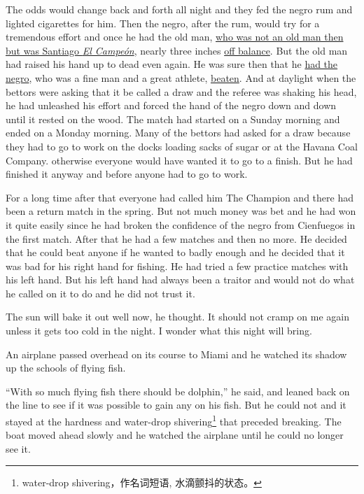 The \gls{odds} would change back and \gls{forth} all night and they fed the
negro \gls{rum} and lighted cigarettes for him. Then the negro, after the
rum, would try for a \gls{tremendous} effort and once he had the old man,
\uline{who was not an old man then but was Santiago \emph{El Campeón}},
nearly three inches \uline{off balance}. But the old man had raised his hand
up to dead even again. He was sure then that he \uline{had the negro}, who
was a fine man and a great \gls{athlete}, \uline{beaten}. And at daylight
when the bettors were asking that it be called a draw and the referee was
shaking his head, he had unleashed his effort and forced the hand of the
negro down and down until it rested on the wood. The match had started on a
Sunday morning and ended on a Monday morning. Many of the bettors had asked
for a draw because they had to go to work on the docks \gls{loading} sacks
of sugar or at the Havana Coal Company. \Gls{otherwise} everyone would have
wanted it to go to a finish. But he had finished it anyway and before anyone
had to go to work.

For a long time after that everyone had called him The Champion and there
had been a return match in the spring. But not much money was bet and he had
won it quite easily since he had broken the confidence of the negro from
Cienfuegos in the first match. After that he had a few matches and then no
more. He decided that he could beat anyone if he wanted to \gls{badly}
enough and he decided that it was bad for his right hand for fishing. He had
tried a few practice matches with his left hand. But his left hand had
always been a \gls{traitor} and would not do what he called on it to do and
he did not trust it.

The sun will \gls{bake} it out well now, he thought. It
should not cramp on me again unless it gets too cold in the night. I wonder
what this night will bring.

An airplane passed overhead on its course to Miami and he watched its shadow
 up the schools of flying fish.

``With so much flying fish there should be dolphin,'' he said, and leaned
back on the line to see if it was possible to gain any on his fish. But he
could not and it stayed at the \gls{hardness} and water-drop
shivering\footnote{water-drop shivering，作名词短语, 水滴颤抖的状态。} that
\gls{preceded} breaking. The boat moved ahead slowly and he watched the
airplane until he could no longer see it.

